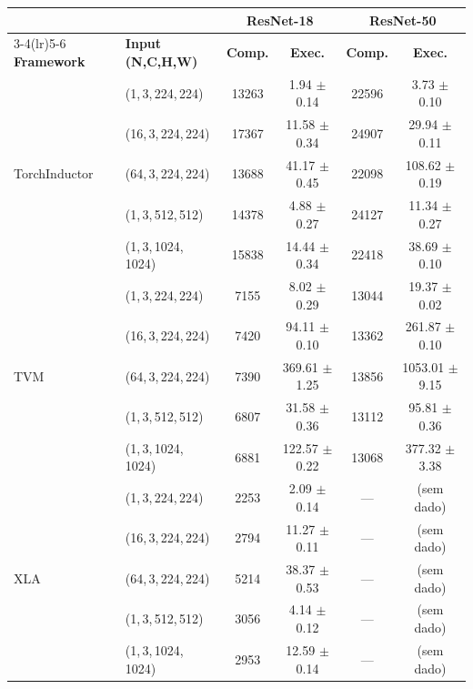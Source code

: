\begin{tabular}{ll cc cc}
\toprule
& & \multicolumn{2}{c}{\textbf{ResNet-18}} & \multicolumn{2}{c}{\textbf{ResNet-50}} \\
\cmidrule(lr){3-4}\cmidrule(lr){5-6}
\textbf{Framework} & \textbf{Input (N,C,H,W)} & \textbf{Comp.} & \textbf{Exec.} & \textbf{Comp.} & \textbf{Exec.} \\
\midrule
\multirow{5}{*}{TorchInductor}
& (1,\,3,\,224,\,224) & 13263 & 1.94 $\pm$ 0.14 & 22596 & 3.73 $\pm$ 0.10 \\
& (16,\,3,\,224,\,224) & 17367 & 11.58 $\pm$ 0.34 & 24907 & 29.94 $\pm$ 0.11 \\
& (64,\,3,\,224,\,224) & 13688 & 41.17 $\pm$ 0.45 & 22098 & 108.62 $\pm$ 0.19 \\
& (1,\,3,\,512,\,512) & 14378 & 4.88 $\pm$ 0.27 & 24127 & 11.34 $\pm$ 0.27 \\
& (1,\,3,\,1024,\,1024) & 15838 & 14.44 $\pm$ 0.34 & 22418 & 38.69 $\pm$ 0.10 \\
\midrule
\multirow{5}{*}{TVM}
& (1,\,3,\,224,\,224) & 7155 & 8.02 $\pm$ 0.29 & 13044 & 19.37 $\pm$ 0.02 \\
& (16,\,3,\,224,\,224) & 7420 & 94.11 $\pm$ 0.10 & 13362 & 261.87 $\pm$ 0.10 \\
& (64,\,3,\,224,\,224) & 7390 & 369.61 $\pm$ 1.25 & 13856 & 1053.01 $\pm$ 9.15 \\
& (1,\,3,\,512,\,512) & 6807 & 31.58 $\pm$ 0.36 & 13112 & 95.81 $\pm$ 0.36 \\
& (1,\,3,\,1024,\,1024) & 6881 & 122.57 $\pm$ 0.22 & 13068 & 377.32 $\pm$ 3.38 \\
\midrule
\multirow{5}{*}{XLA}
& (1,\,3,\,224,\,224) & 2253 & 2.09 $\pm$ 0.14 & \multicolumn{1}{c}{---} & \multicolumn{1}{c}{(sem dado)} \\
& (16,\,3,\,224,\,224) & 2794 & 11.27 $\pm$ 0.11 & \multicolumn{1}{c}{---} & \multicolumn{1}{c}{(sem dado)} \\
& (64,\,3,\,224,\,224) & 5214 & 38.37 $\pm$ 0.53 & \multicolumn{1}{c}{---} & \multicolumn{1}{c}{(sem dado)} \\
& (1,\,3,\,512,\,512) & 3056 & 4.14 $\pm$ 0.12 & \multicolumn{1}{c}{---} & \multicolumn{1}{c}{(sem dado)} \\
& (1,\,3,\,1024,\,1024) & 2953 & 12.59 $\pm$ 0.14 & \multicolumn{1}{c}{---} & \multicolumn{1}{c}{(sem dado)} \\
\bottomrule
\end{tabular}
